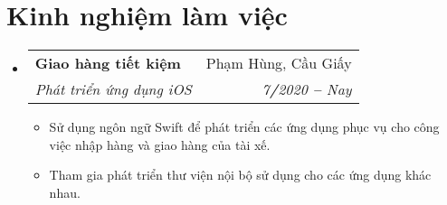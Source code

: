 \documentclass[letterpaper,11pt]{article}
\makeatletter
\newcommand{\resumeItem}[1]{
  \item\small{
    {#1 \vspace{-2pt}}
  }
}
\newcommand{\resumeSubheading}[4]{
  \vspace{-2pt}\item
    \begin{tabular*}{0.97\textwidth}[t]{l@{\extracolsep{\fill}}r}
      \textbf{#1} & #2 \\
      \textit{\small#3} & \textit{\small #4} \\
    \end{tabular*}\vspace{-7pt}
}
\newcommand{\resumeSubHeadingListStart}{\begin{itemize}[leftmargin=0.15in, label={}]}
\newcommand{\resumeSubHeadingListEnd}{\end{itemize}}
\newcommand{\resumeItemListStart}{\begin{itemize}}
\newcommand{\resumeItemListEnd}{\end{itemize}\vspace{-5pt}}
\makeatother
\begin{document}




\section{Kinh nghiệm làm việc}
  \vspace{3pt}
  \resumeSubHeadingListStart
    
    \resumeSubheading
      {Giao hàng tiết kiệm}{Phạm Hùng, Cầu Giấy}
      {Phát triển ứng dụng iOS}{7\textbf{/}2020 \textbf{--} Nay}
        \resumeItemListStart
            \resumeItem{Sử dụng ngôn ngữ Swift để phát triển các ứng dụng phục vụ cho công việc nhập hàng và giao hàng của tài xế.}
            \resumeItem{Tham gia phát triển thư viện nội bộ sử dụng cho các ứng dụng khác nhau.}
            
        \resumeItemListEnd
    


    
  \resumeSubHeadingListEnd



\end{document}
